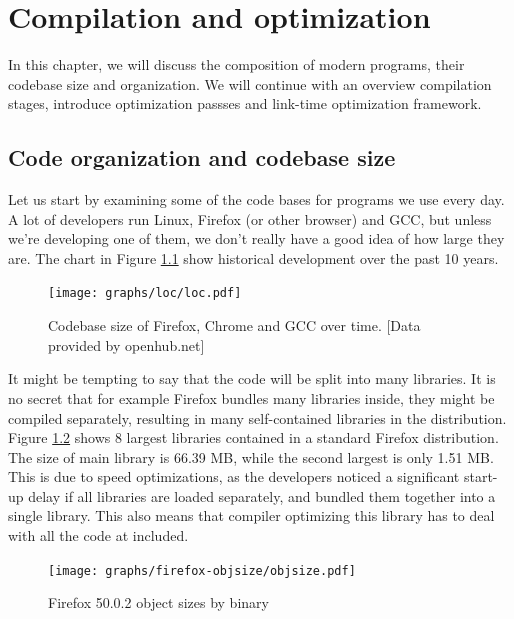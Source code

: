 \newcommand{\definice}{\paragraph{Definice.}}

\chapter{Compilation and optimization}

In this chapter, we will discuss the composition of modern
programs, their codebase size and organization. We will continue with an
overview compilation stages, introduce optimization passses and link-time
optimization framework.

\section{Code organization and codebase size}

Let us start by examining some of the code bases for programs we use every day.
A lot of developers run Linux, Firefox (or other browser) and GCC, but
unless we're developing one of them, we don't really have a good idea of how large
they are. The chart in Figure \ref{figure-loc} show historical development over
the past 10 years.

\begin{figure}[h!]
\label{figure-loc}
\centering
	\hspace{-1cm}\texttt{[image: graphs/loc/loc.pdf]}
\caption{Codebase size of Firefox, Chrome and GCC over time. [Data provided by
	openhub.net]}
\end{figure}

It might be tempting to say that the code will be split into many libraries. It
is no secret that for example Firefox bundles many libraries inside, they might
be compiled separately, resulting in many self-contained libraries in the
distribution. Figure \ref{figure-firefox-objsize} shows 8 largest libraries
contained in a standard Firefox distribution. The size of main library is 66.39
MB, while the second largest is only 1.51 MB. This is due to speed optimizations, as
the developers noticed a significant start-up delay if all libraries are
loaded separately, and bundled them together into a single library. This also
means that compiler optimizing this library has to deal with all the code at
included.

\begin{figure}[h!]
\label{figure-firefox-objsize}
\centering
\texttt{[image: graphs/firefox-objsize/objsize.pdf]}
\caption{Firefox 50.0.2 object sizes by binary}
\end{figure}

